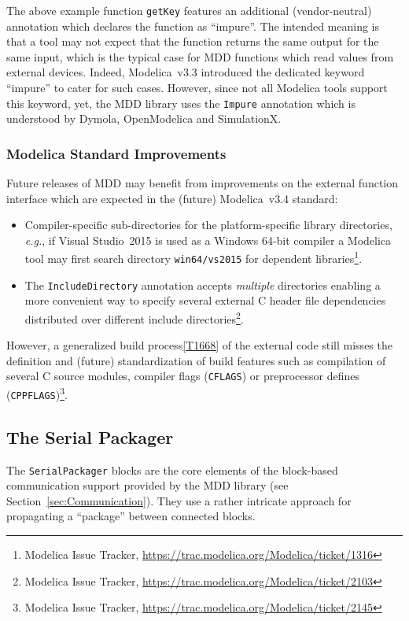 \documentclass{resources/modelica}
\newcommand{\clang}[1]{\lstinline[language=c]|#1|}
\newcommand{\modelica}[1]{\lstinline[language=modelica]|#1|}
\begin{document}
The above example function \modelica{getKey} features an additional (vendor-neutral) annotation which declares the function
as ``impure''. The intended meaning is that a tool may not expect that the
function returns the same output for the same input, which is the typical case
for MDD functions which read values from external devices. Indeed, Modelica~v3.3 introduced the dedicated keyword
``impure'' to cater for such cases. However, since not all Modelica tools support this
keyword, yet, the MDD library uses the \modelica{Impure} annotation which is understood
by Dymola, OpenModelica and SimulationX.

\subsubsection{Modelica Standard Improvements}

Future releases of MDD may benefit from improvements on the external
function interface which are expected in the (future) Modelica~v3.4 standard:
\begin{itemize}
 \item Compiler-specific sub-directories for the platform-specific library directories, \textit{e.g.}, if Visual Studio~2015 is used as a Windows 64-bit compiler a Modelica tool may first search directory \modelica{win64/vs2015} for dependent libraries\footnote{Modelica Issue Tracker, \url{https://trac.modelica.org/Modelica/ticket/1316}}.
 \item The \modelica{IncludeDirectory} annotation accepts \emph{multiple} directories enabling a more convenient way to specify several external C header file dependencies distributed over different include directories\footnote{Modelica Issue Tracker, \url{https://trac.modelica.org/Modelica/ticket/2103}}.
\end{itemize}

However, a generalized build process\cref{T1668} of the external code still misses the definition and (future) standardization of build features such as compilation of several C source modules, compiler flags (\clang{CFLAGS}) or preprocessor defines (\clang{CPPFLAGS})\footnote{Modelica Issue Tracker, \url{https://trac.modelica.org/Modelica/ticket/2145}}.

\subsection{The Serial Packager}
\label{sec:SerialPackager}

The \modelica{SerialPackager} blocks are the core elements of the block-based
communication support provided by the MDD library (see
Section~\ref{sec:Communication}). They use a rather intricate approach for
propagating a ``package'' between connected blocks.
\end{document}
